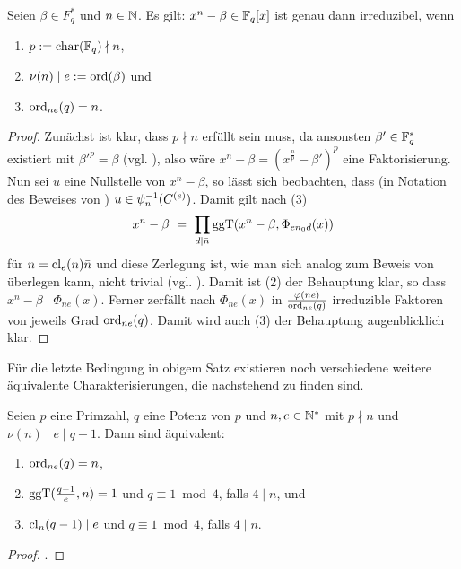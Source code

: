 \begin{satz}
  \label{satz:binom_irreduzibel}
  Seien $\beta \in F_q^\ast$ und $n\in \mathbb{N}$. Es gilt:
  $x^n -\beta \in \mathbb{F}_q[x]$ ist genau
  dann irreduzibel, wenn 
  \begin{enumerate}
    \item $p := \operatorname{char}(\mathbb{F}_q) \nmid n$,
    \item $\nu(n) \mid e := \operatorname{ord}(\beta)$ und
    \item $\operatorname{ord}_{ne}(q) = n$.
  \end{enumerate}
\end{satz}
\begin{proof}
  Zunächst ist klar, dass $p \nmid n$ erfüllt sein muss, da ansonsten 
  $\beta' \in \mathbb{F}_q^\ast$ existiert mit $\beta'^p = \beta$ 
  (vgl. ), also wäre
  $x^n-\beta = (x^\frac n p - \beta')^p$ eine Faktorisierung.
  Nun sei $u$ eine Nullstelle von $x^n-\beta$, so lässt sich beobachten, dass
  (in Notation des Beweises von
  )
  $u \in \psi_n^{-1}(C^{(e)})$. Damit gilt nach
   (3)
  \[ x^n-\beta \ =\  \prod_{d\mid \bar n} \operatorname{ggT}(x^n-\beta, \Phi_{en_0d}(x))\]
  für $n = \operatorname{cl}_{e}(n) \bar n$ und diese Zerlegung ist, wie man sich analog zum
  Beweis von  überlegen kann, 
  nicht trivial (vgl. \autocite[Theorem \ldots]{hachenberger2015}). 
  Damit ist (2) der Behauptung
  klar, so dass $x^n-\beta \mid \Phi_{ne}(x)$. Ferner zerfällt nach
   $\Phi_{ne}(x)$ in 
  $\frac{\varphi(ne)}{\operatorname{ord}_{ne}(q)}$ irreduzible Faktoren von jeweils Grad
  $\operatorname{ord}_{ne}(q)$. Damit wird auch (3) der Behauptung augenblicklich klar.
\end{proof}

Für die letzte Bedingung in obigem Satz existieren noch verschiedene weitere
äquivalente Charakterisierungen, die nachstehend zu finden sind.

\begin{satz}
  \label{satz:binom_irreduzibel_aquiv}
  Seien $p$ eine Primzahl, $q$ eine Potenz von $p$ und $n,e\in \mathbb{N}^\ast$ 
  mit $p\nmid n$ und $\nu(n)\mid e\mid q-1$. Dann sind äquivalent:
  \begin{enumerate}
    \item $\operatorname{ord}_{ne}(q)  = n$,
    \item $\operatorname{ggT}(\tfrac{q-1}{e},n)=1$ und $q\equiv 1 \bmod 4$, falls $4\mid n$,
      und
    \item $\operatorname{cl}_n(q-1) \mid e$ und $q\equiv 1 \bmod 4$, falls $4\mid n$.
  \end{enumerate}
\end{satz}
\begin{proof}
  \autocite[Theorem \ldots]{hachenberger2015}.
\end{proof}


